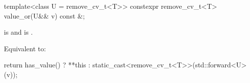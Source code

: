 %
\begin{itemdecl}
template<class U = remove_cv_t<T>> constexpr remove_cv_t<T> value_or(U&& v) const &;
\end{itemdecl}

\begin{itemdescr}
\pnum
\mandates
{} is  and  is .

\pnum
\effects
Equivalent to:
\begin{codeblock}
return has_value() ? **this : static_cast<remove_cv_t<T>>(std::forward<U>(v));
\end{codeblock}
\end{itemdescr}
